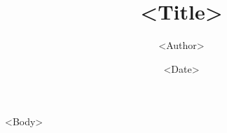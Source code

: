 \documentclass{report}
\title{<Title>}
\author{<Author>}
\date{<Date>}
\begin{document}
\maketitle
\tableofcontents

<Body>
\end{document}

